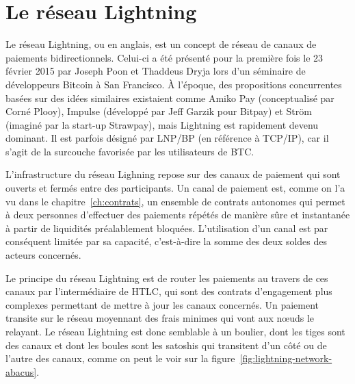 \section*{Le réseau Lightning}


Le réseau Lightning, ou  en anglais, est un concept de réseau de canaux de paiements bidirectionnels. Celui-ci a été présenté pour la première fois le 23 février 2015 par Joseph Poon et Thaddeus Dryja lors d'un séminaire de développeurs Bitcoin à San Francisco. À l'époque, des propositions concurrentes basées sur des idées similaires existaient comme Amiko Pay (conceptualisé par Corné Plooy), Impulse (développé par Jeff Garzik pour Bitpay) et Ström (imaginé par la start-up Strawpay), mais Lightning est rapidement devenu dominant. Il est parfois désigné par LNP/BP (en référence à TCP/IP), car il s'agit de la surcouche favorisée par les utilisateurs de BTC.

L'infrastructure du réseau Lighning repose sur des canaux de paiement qui sont ouverts et fermés entre des participants. Un canal de paiement est, comme on l'a vu dans le chapitre~\ref{ch:contrats}, un ensemble de contrats autonomes qui permet à deux personnes d'effectuer des paiements répétés de manière sûre et instantanée à partir de liquidités préalablement bloquées. L'utilisation d'un canal est par conséquent limitée par sa capacité, c'est-à-dire la somme des deux soldes des acteurs concernés.

Le principe du réseau Lightning est de router les paiements au travers de ces canaux par l'intermédiaire de HTLC, qui sont des contrats d'engagement plus complexes permettant de mettre à jour les canaux concernés. Un paiement transite sur le réseau moyennant des frais minimes qui vont aux nœuds le relayant. Le réseau Lightning est donc semblable à un boulier, dont les tiges sont des canaux et dont les boules sont les satoshis qui transitent d'un côté ou de l'autre des canaux, comme on peut le voir sur la figure~\ref{fig:lightning-network-abacus}.

